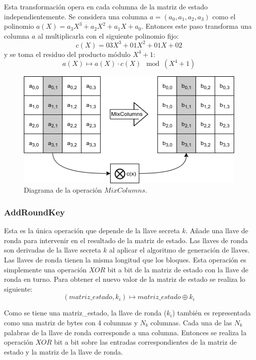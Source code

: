 Esta transformación opera en cada columna de la matriz de estado
independientemente. Se considera una columna $a = (a_0, a_1, a_2, a_3)$
como el polinomio $a(X) = a_3X^3 + a_2X^2 + a_1X + a_0$.
Entonces este paso transforma una columna $a$ al multiplicarla con el
siguiente polinomio fijo:
\begin{equation}
  \label{cifrado_aes_poli}
  c(X) = 03X^3 + 01X^2 + 01X+ 02
\end{equation}
y se toma el residuo del producto módulo $X^4+1$:
\begin{equation}
  \label{cifrado_aes_mix}
  a(X) \mapsto a(X) \cdotp c(X) \mod (X^4+1)
\end{equation}

\begin{figure}
  \begin{center}
    \includegraphics[width=0.6\linewidth]{diagramas/mixColumns}
    \caption{Diagrama de la operación $MixColumns$.}
   \end{center}
\end{figure}


\subsubsection{AddRoundKey}

Esta es la única operación que depende de la llave secreta $k$. Añade una
llave de ronda para intervenir en el resultado de la matriz de estado.
Las llaves de ronda son derivadas de la llave secreta $k$ al aplicar el
algoritmo de generación de llaves. Las llaves de ronda tienen la misma
longitud que los bloques. Esta operación es simplemente una operación
$XOR$ bit a bit de la matriz de estado con la llave de ronda en turno.
Para obtener el nuevo valor de la matriz de estado se realiza lo
siguiente:
\begin{equation}
  \label{cifrado_aes_addkey}
  (matriz\_estado, k_i) \mapsto matriz\_estado \oplus k_i
\end{equation}

Como se tiene una matriz\_estado, la llave de ronda ($k_i$) también
es representada como una matriz de bytes con 4 columnas y $N_b$ columnas.
Cada una de las $N_b$ palabras de la llave de ronda corresponde a una
columna. Entonces se realiza la operación $XOR$ bit a bit sobre las
entradas correspondientes de la matriz de estado y la matriz de la llave
de ronda.


